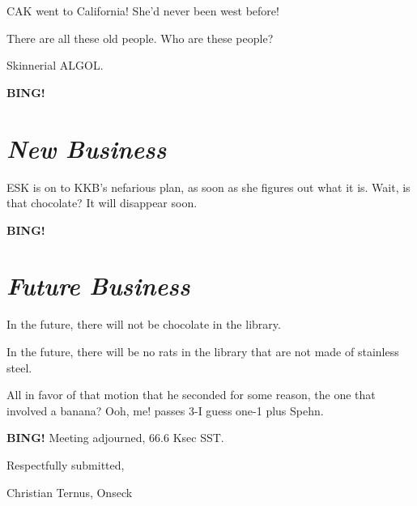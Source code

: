 \documentclass[10pt]{article}
\newcommand{\bing}{{\bf BING!} }
\newcommand{\goto}[1]{\bing \vskip 12pt \section*{{\em{#1}}}}
\newcommand{\ps}{ plus Spehn\xspace}
\begin{document}
CAK went to California!  She'd never been west before!

There are all these old people.  Who are these people?

Skinnerial ALGOL.

\goto{New Business}

ESK is on to KKB's nefarious plan, as soon as she figures out what it
is.  Wait, is that chocolate?  It will disappear soon.

\goto{Future Business}

In the future, there will not be chocolate in the library.

In the future, there will be no rats in the library that are not made
of stainless steel.

All in favor of that motion that he seconded for some reason, the one
that involved a banana?  Ooh, me!  passes 3-I guess one-1 \ps.

\bing
\noindent
Meeting adjourned, 66.6 Ksec SST.

\vspace{18pt}

\centerline{Respectfully submitted,}
\centerline{Christian Ternus, Onseck}
\end{document}
